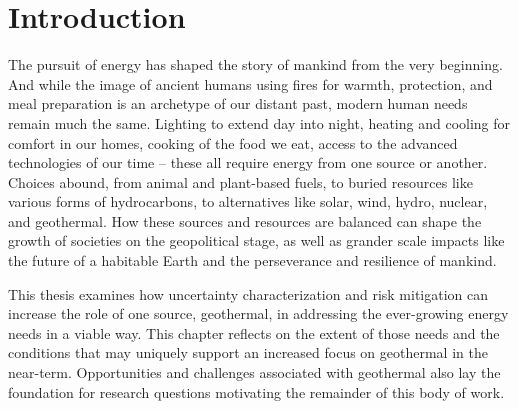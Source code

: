 \chapter{Introduction}\label{ch1:intro}
The pursuit of energy has shaped the story of mankind from the very beginning. And while the image of ancient humans using fires for warmth, protection, and meal preparation is an archetype of our distant past, modern human needs remain much the same. Lighting to extend day into night, heating and cooling for comfort in our homes, cooking of the food we eat, access to the advanced technologies of our time – these all require energy from one source or another.  Choices abound, from animal and plant-based fuels, to buried resources like various forms of hydrocarbons, to alternatives like solar, wind, hydro, nuclear, and geothermal. How these sources and resources are balanced can shape the growth of societies on the geopolitical stage, as well as grander scale impacts like the future of a habitable Earth and the perseverance and resilience of mankind.

This thesis examines how uncertainty characterization and risk mitigation can increase the role of one source, geothermal, in addressing the ever-growing energy needs in a viable way. This chapter reflects on the extent of those needs and the conditions that may uniquely support an increased focus on geothermal in the near-term. Opportunities and challenges associated with geothermal also lay the foundation for research questions motivating the remainder of this body of work.

